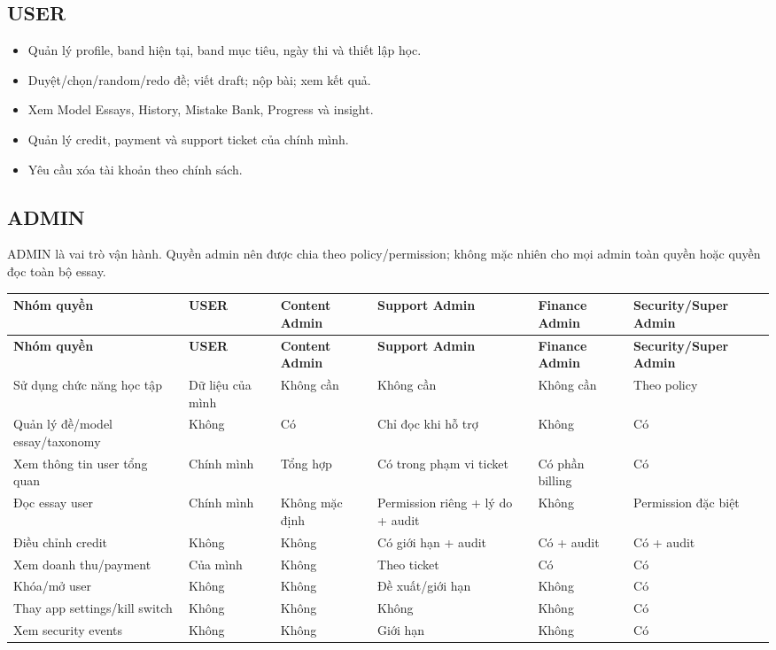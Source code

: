 \documentclass[11pt,a4paper]{article}
\begin{document}
\subsection{USER}
\begin{itemize}
  \item Quản lý profile, band hiện tại, band mục tiêu, ngày thi và thiết lập học.
  \item Duyệt/\allowbreak{}chọn/\allowbreak{}random/\allowbreak{}redo đề; viết draft; nộp bài; xem kết quả.
  \item Xem Model Essays, History, Mistake Bank, Progress và insight.
  \item Quản lý credit, payment và support ticket của chính mình.
  \item Yêu cầu xóa tài khoản theo chính sách.
\end{itemize}
\subsection{ADMIN}
ADMIN là vai trò vận hành. Quyền admin nên được chia theo policy/\allowbreak{}permission; không mặc nhiên cho mọi admin toàn quyền hoặc quyền đọc toàn bộ essay.

\begin{landscape}
\small
\setlength{\tabcolsep}{4pt}
\renewcommand{\arraystretch}{1.18}
\begin{longtable}{|P{0.24\textwidth}|P{0.12\textwidth}|P{0.14\textwidth}|P{0.16\textwidth}|P{0.14\textwidth}|P{0.16\textwidth}|}
\hline
\textbf{Nhóm quyền} & \textbf{USER} & \textbf{Content Admin} & \textbf{Support Admin} & \textbf{Finance Admin} & \textbf{Security/\allowbreak{}Super Admin} \\ \hline
\endfirsthead
\hline
\textbf{Nhóm quyền} & \textbf{USER} & \textbf{Content Admin} & \textbf{Support Admin} & \textbf{Finance Admin} & \textbf{Security/\allowbreak{}Super Admin} \\ \hline
\endhead
Sử dụng chức năng học tập & Dữ liệu của mình & Không cần & Không cần & Không cần & Theo policy \\ \hline
Quản lý đề/\allowbreak{}model essay/\allowbreak{}taxonomy & Không & Có & Chỉ đọc khi hỗ trợ & Không & Có \\ \hline
Xem thông tin user tổng quan & Chính mình & Tổng hợp & Có trong phạm vi ticket & Có phần billing & Có \\ \hline
Đọc essay user & Chính mình & Không mặc định & Permission riêng + lý do + audit & Không & Permission đặc biệt \\ \hline
Điều chỉnh credit & Không & Không & Có giới hạn + audit & Có + audit & Có + audit \\ \hline
Xem doanh thu/\allowbreak{}payment & Của mình & Không & Theo ticket & Có & Có \\ \hline
Khóa/\allowbreak{}mở user & Không & Không & Đề xuất/\allowbreak{}giới hạn & Không & Có \\ \hline
Thay app settings/\allowbreak{}kill switch & Không & Không & Không & Không & Có \\ \hline
Xem security events & Không & Không & Giới hạn & Không & Có \\ \hline
\end{longtable}
\normalsize
\end{landscape}
\end{document}
